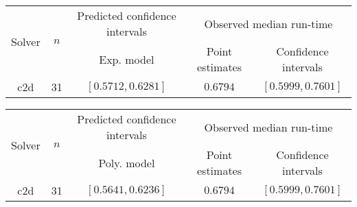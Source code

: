 \begin{tabular}{ccccc}
\hline 
\multirow{2}{*}{Solver} & \multirow{2}{*}{$n$} & Predicted confidence intervals & \multicolumn{2}{c}{Observed median  run-time}\tabularnewline
 &  & Exp. model  & Point estimates  & Confidence intervals\tabularnewline
\hline 
\hline 
\multirow{0}{*}{c2d} & 31 & $\mathbf{\left[0.5712,0.6281\right]}$ & $0.6794$ & $\left[0.5999,0.7601\right]$ \tabularnewline 
\hline 
\end{tabular} 

\begin{tabular}{ccccc}
\hline 
\multirow{2}{*}{Solver} & \multirow{2}{*}{$n$} & Predicted confidence intervals & \multicolumn{2}{c}{Observed median  run-time}\tabularnewline
 &  & Poly. model  & Point estimates  & Confidence intervals\tabularnewline
\hline 
\hline 
\multirow{0}{*}{c2d} & 31 & $\mathbf{\left[0.5641,0.6236\right]}$ & $0.6794$ & $\left[0.5999,0.7601\right]$ \tabularnewline 
\hline 
\end{tabular} 



